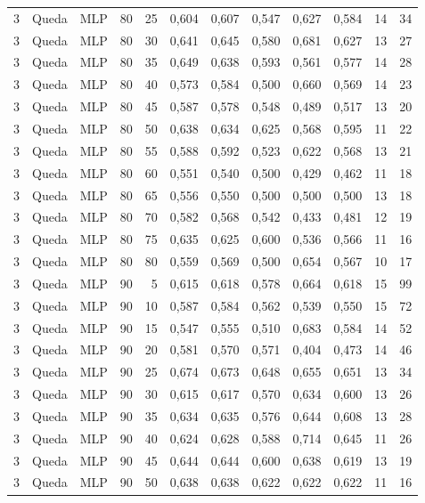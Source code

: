 \begin{longtable}{@{}rllrrrrrrrrr@{}}
3 & Queda & MLP & 80 & 25 & 0,604 & 0,607 & 0,547 & 0,627 & 0,584 & 14 & 34 \\
3 & Queda & MLP & 80 & 30 & 0,641 & 0,645 & 0,580 & 0,681 & 0,627 & 13 & 27 \\
3 & Queda & MLP & 80 & 35 & 0,649 & 0,638 & 0,593 & 0,561 & 0,577 & 14 & 28 \\
3 & Queda & MLP & 80 & 40 & 0,573 & 0,584 & 0,500 & 0,660 & 0,569 & 14 & 23 \\
3 & Queda & MLP & 80 & 45 & 0,587 & 0,578 & 0,548 & 0,489 & 0,517 & 13 & 20 \\
3 & Queda & MLP & 80 & 50 & 0,638 & 0,634 & 0,625 & 0,568 & 0,595 & 11 & 22 \\
3 & Queda & MLP & 80 & 55 & 0,588 & 0,592 & 0,523 & 0,622 & 0,568 & 13 & 21 \\
3 & Queda & MLP & 80 & 60 & 0,551 & 0,540 & 0,500 & 0,429 & 0,462 & 11 & 18 \\
3 & Queda & MLP & 80 & 65 & 0,556 & 0,550 & 0,500 & 0,500 & 0,500 & 13 & 18 \\
3 & Queda & MLP & 80 & 70 & 0,582 & 0,568 & 0,542 & 0,433 & 0,481 & 12 & 19 \\
3 & Queda & MLP & 80 & 75 & 0,635 & 0,625 & 0,600 & 0,536 & 0,566 & 11 & 16 \\
3 & Queda & MLP & 80 & 80 & 0,559 & 0,569 & 0,500 & 0,654 & 0,567 & 10 & 17 \\
3 & Queda & MLP & 90 & 5 & 0,615 & 0,618 & 0,578 & 0,664 & 0,618 & 15 & 99 \\
3 & Queda & MLP & 90 & 10 & 0,587 & 0,584 & 0,562 & 0,539 & 0,550 & 15 & 72 \\
3 & Queda & MLP & 90 & 15 & 0,547 & 0,555 & 0,510 & 0,683 & 0,584 & 14 & 52 \\
3 & Queda & MLP & 90 & 20 & 0,581 & 0,570 & 0,571 & 0,404 & 0,473 & 14 & 46 \\
3 & Queda & MLP & 90 & 25 & 0,674 & 0,673 & 0,648 & 0,655 & 0,651 & 13 & 34 \\
3 & Queda & MLP & 90 & 30 & 0,615 & 0,617 & 0,570 & 0,634 & 0,600 & 13 & 26 \\
3 & Queda & MLP & 90 & 35 & 0,634 & 0,635 & 0,576 & 0,644 & 0,608 & 13 & 28 \\
3 & Queda & MLP & 90 & 40 & 0,624 & 0,628 & 0,588 & 0,714 & 0,645 & 11 & 26 \\
3 & Queda & MLP & 90 & 45 & 0,644 & 0,644 & 0,600 & 0,638 & 0,619 & 13 & 19 \\
3 & Queda & MLP & 90 & 50 & 0,638 & 0,638 & 0,622 & 0,622 & 0,622 & 11 & 16 \\

\end{longtable}

